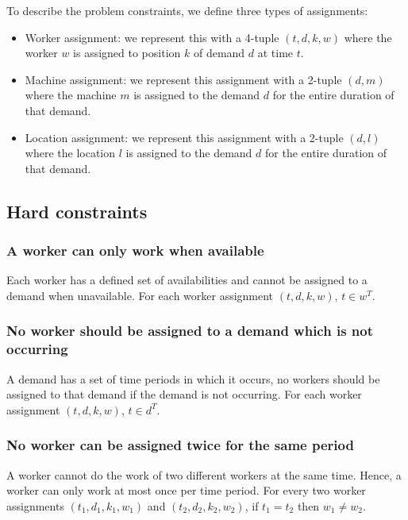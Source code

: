 \documentclass[../thesis.tex]{subfiles}
\begin{document}
To describe the problem constraints, we define three types of assignments:

\begin{itemize}
  \item Worker assignment: we represent this with a 4-tuple $(t, d, k, w)$ where the worker $w$ is assigned to position $k$ of demand $d$ at time $t$.
  \item Machine assignment: we represent this assignment with a 2-tuple $(d, m)$ where the machine $m$ is assigned to the 
        demand $d$ for the entire duration of that demand.
  \item Location assignment: we represent this assignment 
        with a 2-tuple $(d, l)$ where the location $l$ is assigned to the demand $d$ for the entire duration 
        of that demand.
\end{itemize}

\subsection{Hard constraints}

\subsubsection{A worker can only work when available}

Each worker has a defined set of availabilities and cannot be assigned to a demand when 
unavailable.
For each worker assignment $(t, d, k, w)$, $t \in w^T$.

\subsubsection{No worker should be assigned to a demand which is not occurring}

A demand has a set of time periods in which it occurs,
no workers should be assigned to that demand if the demand is not 
occurring. 
For each worker assignment $(t, d, k, w)$, $t \in d^T$.

\subsubsection{No worker can be assigned twice for the same period} 

A worker cannot do the work of two different workers at the same time.
Hence, a worker can only work at most once per time period.
For every two worker assignments $(t_1, d_1, k_1, w_1)$ and $(t_2, d_2, k_2, w_2)$, if $t_1 = t_2$ then $w_1 \neq w_2$.
\end{document}
